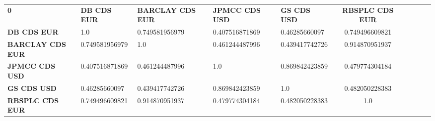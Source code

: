 \begin{tabular}{|l|l|l|l|l|c|c|c|c|c|}
\hline
\textbf{0} & \textbf{DB CDS EUR} & \textbf{BARCLAY CDS EUR} & \textbf{JPMCC CDS USD} & \textbf{GS CDS USD} & \textbf{RBSPLC CDS EUR}\\\hhline{|=|=|=|=|=|=|}
\textbf{DB CDS EUR} & 1.0 & 0.749581956979 & 0.407516871869 & 0.46285660097 & 0.749496609821\\
\textbf{BARCLAY CDS EUR} & 0.749581956979 & 1.0 & 0.461244487996 & 0.439417742726 & 0.914870951937\\
\textbf{JPMCC CDS USD} & 0.407516871869 & 0.461244487996 & 1.0 & 0.869842423859 & 0.479774304184\\
\textbf{GS CDS USD} & 0.46285660097 & 0.439417742726 & 0.869842423859 & 1.0 & 0.482050228383\\
\textbf{RBSPLC CDS EUR} & 0.749496609821 & 0.914870951937 & 0.479774304184 & 0.482050228383 & 1.0\\
\hline
\end{tabular}
